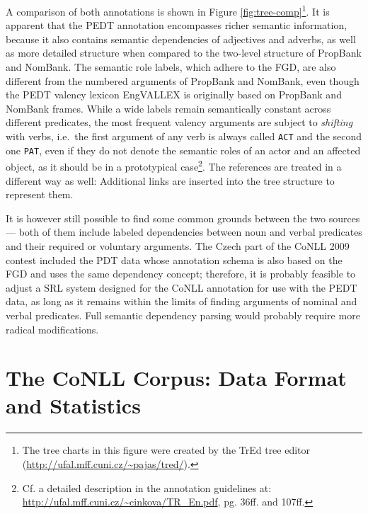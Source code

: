 \documentclass[12pt,notitlepage,a4paper]{report}
\begin{document}
A comparison of both annotations is shown in Figure \ref{fig:tree-comp}\footnote{The tree charts in this figure were created by the TrEd tree editor\\(\url{http://ufal.mff.cuni.cz/\~pajas/tred/}).}. It is apparent that the PEDT annotation encompasses richer semantic information, because it also contains semantic dependencies of adjectives and adverbs, as well as more detailed structure when compared to the two-level structure of PropBank and NomBank. The semantic role labels, which adhere to the FGD, are also different from the numbered arguments of PropBank and NomBank, even though the PEDT valency lexicon EngVALLEX \citep{semecky06} is originally based on PropBank and NomBank frames. While a wide labels remain semantically constant across different predicates, the most frequent valency arguments are subject to \emph{shifting} with verbs, i.e.\ the first argument of any verb is always called \texttt{ACT} and the second one \texttt{PAT}, even if they do not denote the semantic roles of an actor and an affected object, as it should be in a prototypical case\footnote{Cf. a detailed description in the annotation guidelines at: \\ \url{http://ufal.mff.cuni.cz/\~cinkova/TR\_En.pdf}, pg. 36ff. and 107ff.}. The references are treated in a different way as well: Additional links are inserted into the tree structure to represent them.

It is however still possible to find some common grounds between the two sources --- both of them include labeled dependencies between noun and verbal predicates and their required or voluntary arguments. The Czech part of the CoNLL 2009 contest included the PDT data whose annotation schema is also based on the FGD and uses the same dependency concept; therefore, it is probably feasible to adjust a SRL system designed for the CoNLL annotation for use with the PEDT data, as long as it remains within the limits of finding arguments of nominal and verbal predicates. Full semantic dependency parsing would probably require more radical modifications.

\section{The CoNLL Corpus: Data Format and Statistics}\label{data-format}
\end{document}
